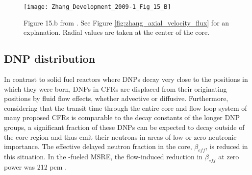 \documentclass[review]{elsarticle}
\begin{document}
\begin{figure}[H]
   \centering
   \texttt{[image: Zhang\_Development\_2009-1\_Fig\_15\_B]}
   \caption{Figure 15.b from \cite{zhang_development_2009-1}.
            See Figure \ref{fig:zhang_axial_velocity_flux} for an explanation.
               Radial 
               values are taken at the center of the core.}
   \label{fig:zhang_radial_velocity_flux}
\end{figure}

\subsection{DNP distribution} \label{ssec:dnpd}
In contrast to solid fuel reactors where DNPs decay
 very close to the positions in which they were born, DNPs in CFRs are displaced
 from their originating positions by fluid flow effects, whether advective or
 diffusive. Furthermore, considering that the transit time through the entire
 core and flow loop system of many proposed CFRs is comparable to the decay
 constants of the longer DNP groups, a significant fraction of these DNPs can be
expected to decay outside of the core region and thus emit their neutrons in areas
of low or zero neutronic importance. The effective delayed neutron fraction in the
 core, $\beta_{eff}$, is reduced in this situation. In the -fueled MSRE,
 the flow-induced reduction in $\beta_{eff}$ at zero power was 212 pcm \cite{delpech_benchmark_2003}.
\end{document}
